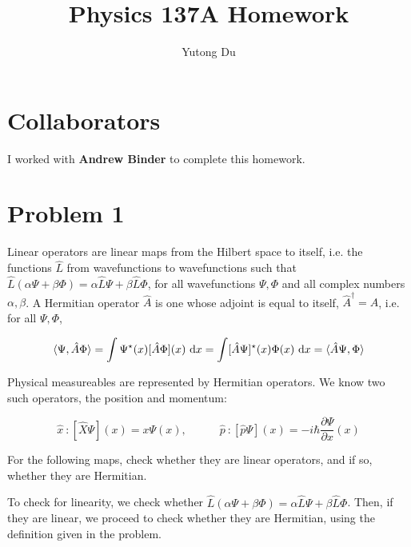 \documentclass{article}
\title{Physics 137A Homework}
\author{Yutong Du}
\begin{document}
\maketitle 

\section*{Collaborators}

I worked with \textbf{Andrew Binder} to complete this homework.


\section*{Problem 1}

Linear operators are linear maps from the Hilbert space to itself, i.e. the functions $\hat L$ from wavefunctions to wavefunctions such that $\hat L(\alpha  \Psi + \beta  \Phi) = \alpha \hat L \Psi + \beta \hat L  \Phi$, for all wavefunctions $\Psi, \Phi$ and all complex numbers $\alpha, \beta$. A Hermitian operator $\hat A$ is one whose adjoint is equal to itself, $\hat A^\dagger = \hat A$, i.e. for all $\Psi, \Phi$, 

\[ \langle \Psi, \hat A \Phi \rangle = \int \Psi^\star (x) [\hat A \Phi](x) \ \mathrm d x = \int [\hat A \Psi]^\star (x) \Phi(x) \ \mathrm d x = \langle \hat A \Psi, \Phi \rangle\]

Physical measureables are represented by Hermitian operators. We know two such operators, the position and momentum:

\[ \hat x \ : [\hat X \Psi](x) = x\Psi(x), \hspace{35pt} \hat p \ :[\hat p \Psi](x) = -i\hbar \frac{\partial \Psi}{\partial x} (x)\]

For the following maps, check whether they are linear operators, and if so, whether they are Hermitian. 

\begin{solution}
    To check for linearity, we check whether $\hat L(\alpha  \Psi + \beta  \Phi) = \alpha \hat L \Psi + \beta \hat L  \Phi$. Then, if they are linear, we proceed to check whether they are Hermitian, using the definition given in the problem.
\end{solution} 
\end{document}
